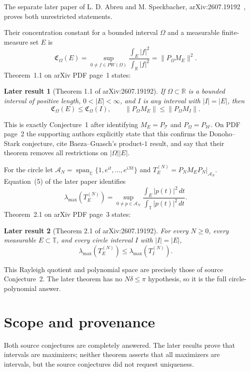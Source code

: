 \documentclass[11pt]{article}
\newtheorem*{laterresult}{Later result}
\begin{document}
The separate later paper of L. D. Abreu and M. Speckbacher,
arXiv:2607.19192~\cite{answer}, proves both unrestricted statements.

Their concentration constant for a bounded interval $\Omega$ and a measurable
finite-measure set $E$ is
\[
 \mathfrak C_\Omega(E)
 =\sup_{0\ne f\in PW(\Omega)}
   \frac{\int_E|f|^2}{\int_{\mathbb R}|f|^2}
 =\lVert P_\Omega M_E\rVert^2.
\]
Theorem~1.1 on arXiv PDF page~1 states:

\begin{laterresult}[Theorem 1.1 of arXiv:2607.19192]
If $\Omega\subset\mathbb R$ is a bounded interval of positive length,
$0<|E|<\infty$, and $I$ is any interval with $|I|=|E|$, then
\[
  \mathfrak C_\Omega(E)\leq\mathfrak C_\Omega(I),
  \qquad
  \lVert P_\Omega M_E\rVert\leq\lVert P_\Omega M_I\rVert.
\]
\end{laterresult}

This is exactly Conjecture~1 after identifying
$M_E=P_{\mathcal T}$ and $P_\Omega=P_{\mathcal W}$.  On PDF page~2 the
supporting authors explicitly state that this confirms the Donoho--Stark
conjecture, cite Baeza--Guasch's product-$1$ result, and say that their theorem
removes all restrictions on $|\Omega||E|$.

For the circle let
$\mathcal A_N=\operatorname{span}_{\mathbb C}\{1,e^{it},\ldots,e^{iNt}\}$
and $T_E^{(N)}=P_NM_EP_N|_{\mathcal A_N}$.  Equation~(5) of the later paper
identifies
\[
 \lambda_{\max}(T_E^{(N)})
 =\sup_{0\ne p\in\mathcal A_N}
   \frac{\int_E|p(t)|^2\,dt}{\int_{\mathbb T}|p(t)|^2\,dt}.
\]
Theorem~2.1 on arXiv PDF page~3 states:

\begin{laterresult}[Theorem 2.1 of arXiv:2607.19192]
For every $N\geq0$, every measurable $E\subset\mathbb T$, and every circle
interval $I$ with $|I|=|E|$,
\[
 \lambda_{\max}(T_E^{(N)})
 \leq \lambda_{\max}(T_I^{(N)}).
\]
\end{laterresult}

This Rayleigh quotient and polynomial space are precisely those of source
Conjecture~2.  The later theorem has no $N\delta\leq\pi$ hypothesis, so it is
the full circle-polynomial answer.

\section{Scope and provenance}

Both source conjectures are completely answered.  The later results prove
that intervals are maximizers; neither theorem asserts that all maximizers are
intervals, but the source conjectures did not request uniqueness.
\end{document}
